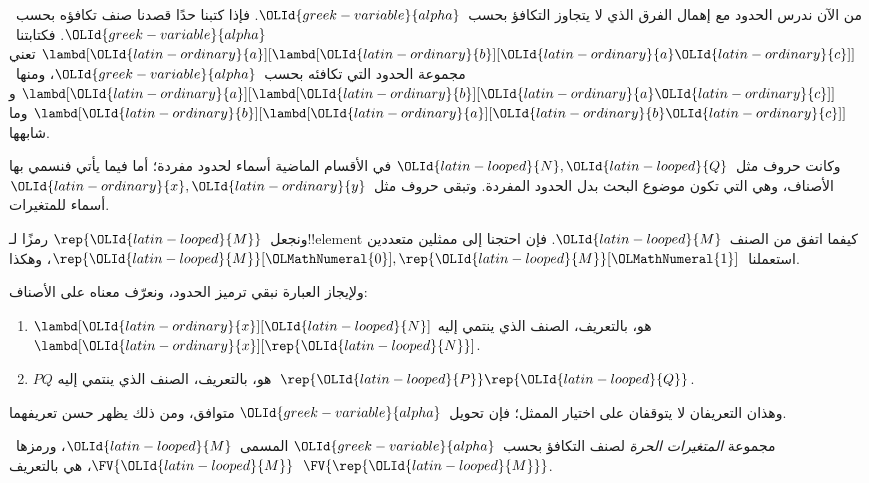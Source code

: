 \documentclass[../../../include/open-logic-section]{subfiles}
\begin{document}

من الآن ندرس الحدود مع إهمال الفرق الذي لا يتجاوز التكافؤ بحسب~$\OLId{greek-variable}{alpha}$.
فإذا كتبنا حدًا قصدنا صنف تكافؤه بحسب~$\OLId{greek-variable}{alpha}$.
فكتابتنا~$\lambd[\OLId{latin-ordinary}{a}][\lambd[\OLId{latin-ordinary}{b}][\OLId{latin-ordinary}{a} \OLId{latin-ordinary}{c}]]$ تعني مجموعة الحدود التي تكافئه بحسب~$\OLId{greek-variable}{alpha}$،
ومنها~$\lambd[\OLId{latin-ordinary}{a}][\lambd[\OLId{latin-ordinary}{b}][\OLId{latin-ordinary}{a} \OLId{latin-ordinary}{c}]]$ و$\lambd[\OLId{latin-ordinary}{b}][\lambd[\OLId{latin-ordinary}{a}][\OLId{latin-ordinary}{b} \OLId{latin-ordinary}{c}]]$ وما شابهها.

وكانت حروف مثل~$\OLId{latin-looped}{N}, \OLId{latin-looped}{Q}$ في الأقسام الماضية أسماء لحدود مفردة؛
أما فيما يأتي فنسمي بها الأصناف، وهي التي تكون موضوع البحث بدل الحدود المفردة.
وتبقى حروف مثل~$\OLId{latin-ordinary}{x}, \OLId{latin-ordinary}{y}$ أسماء للمتغيرات.

ونجعل~$\rep{\OLId{latin-looped}{M}}$ رمزًا لـ!!{element} كيفما اتفق من الصنف~$\OLId{latin-looped}{M}$.
فإن احتجنا إلى ممثلين متعددين استعملنا~$\rep{\OLId{latin-looped}{M}}[\OLMathNumeral{0}], \rep{\OLId{latin-looped}{M}}[\OLMathNumeral{1}]$، وهكذا.

ولإيجاز العبارة نبقي ترميز الحدود، ونعرّف معناه على الأصناف:
\begin{defn}
  \begin{enumerate}
  \item $\lambd[\OLId{latin-ordinary}{x}][\OLId{latin-looped}{N}]$ هو، بالتعريف، الصنف الذي ينتمي إليه
    $\lambd[\OLId{latin-ordinary}{x}][\rep{\OLId{latin-looped}{N}}]$.
  \item $PQ$ هو، بالتعريف، الصنف الذي ينتمي إليه~$\rep{\OLId{latin-looped}{P}}\rep{\OLId{latin-looped}{Q}}$.
  \end{enumerate}
\end{defn}

وهذان التعريفان لا يتوقفان على اختيار الممثل؛ فإن تحويل~$\OLId{greek-variable}{alpha}$ متوافق، ومن ذلك يظهر حسن تعريفهما.

\begin{defn} 
  مجموعة \emph{المتغيرات الحرة} لصنف التكافؤ بحسب~$\OLId{greek-variable}{alpha}$ المسمى~$\OLId{latin-looped}{M}$،
  ورمزها~$\FV{\OLId{latin-looped}{M}}$، هي بالتعريف~$\FV{\rep{\OLId{latin-looped}{M}}}$.
\end{defn}
\end{document}
